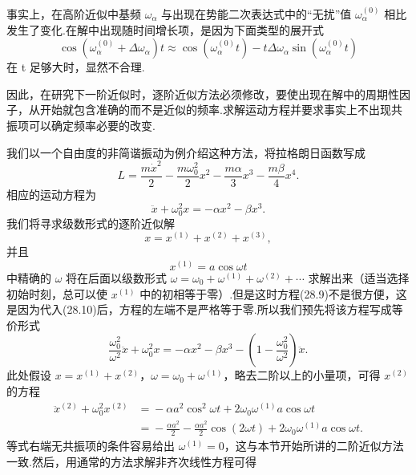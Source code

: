 事实上，在高阶近似中基频 $\omega_\alpha$ 与出现在势能二次表达式中的“无扰”值 $\omega_\alpha^{(0)}$ 相比发生了变化.在解中出现随时间增长项，是因为下面类型的展开式
\begin{equation*}
  \cos\left(\omega_\alpha^{(0)}+\Delta\omega_\alpha\right)t
  \approx\cos\left(\omega_\alpha^{(0)}t\right)-t\Delta\omega_\alpha\sin\left(\omega_\alpha^{(0)}t\right)
\end{equation*}
在 t 足够大时，显然不合理.

因此，在研究下一阶近似时，逐阶近似方法必须修改，要使出现在解中的周期性因子，从开始就包含准确的而不是近似的频率.求解运动方程并要求事实上不出现共振项可以确定频率必要的改变.

我们以一个自由度的非简谐振动为例介绍这种方法，将拉格朗日函数写成
\begin{equation}
  L=\frac{m\dot{x}^2}{2}-\frac{m\omega_0^2}{2}x^2-\frac{m\alpha}{3}x^3-\frac{m\beta}{4}x^4.
\end{equation}
相应的运动方程为
\begin{equation}
  \ddot{x}+\omega_0^2x=-\alpha x^2-\beta x^3.
\end{equation}
我们将寻求级数形式的逐阶近似解
\begin{equation*}
  x=x^{(1)}+x^{(2)}+x^{(3)},
\end{equation*}
并且
\begin{equation}
  x^{(1)}=a\cos\omega t
\end{equation}
中精确的 $\omega$ 将在后面以级数形式 $\omega=\omega_0+\omega^{(1)}+\omega^{(2)}+\cdots$ 求解出来（适当选择初始时刻，总可以使 $x^{(1)}$ 中的初相等于零）.但是这时方程(28.9)不是很方便，这是因为代入(28.10)后，方程的左端不是严格等于零.所以我们预先将该方程写成等价形式
\begin{equation}
  \frac{\omega_0^2}{\omega^2}\ddot{x}+\omega_0^2x
  =-\alpha x^2-\beta x^3-\left(1-\frac{\omega_0^2}{\omega^2}\right)\ddot{x}.
\end{equation}
此处假设 $x=x^{(1)}+x^{(2)}$，$\omega=\omega_0+\omega^{(1)}$，略去二阶以上的小量项，可得 $x^{(2)}$ 的方程
\begin{equation*}
\begin{aligned}
  \ddot{x}^{(2)}+\omega_0^2x^{(2)}
  &={}-\alpha a^2\cos^2\omega t+2\omega_0\omega^{(1)}a\cos\omega t\\
  &={}-\frac{\alpha a^2}{2}-\frac{\alpha a^2}{2}\cos(2\omega t)
  +2\omega_0\omega^{(1)}a\cos\omega t.
\end{aligned}
\end{equation*}
等式右端无共振项的条件容易给出 $\omega^{(1)}=0$，这与本节开始所讲的二阶近似方法一致.然后，用通常的方法求解非齐次线性方程可得
